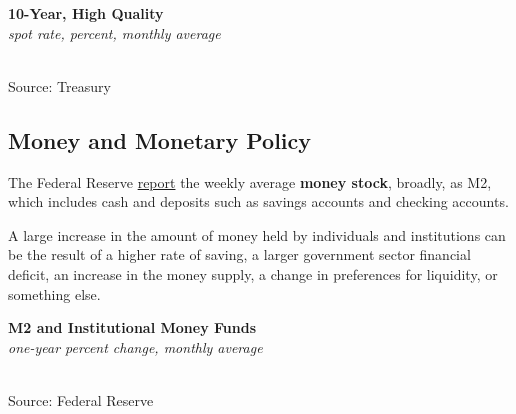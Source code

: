 \documentclass{report}
\makeatletter
\newcommand{\tbllink}[1]{\href{https://raw.githubusercontent.com/bdecon/US-chartbook/master/chartbook/data/#1}{\faTable}}
\newcommand*\short[1]{\expandafter\@gobbletwo\number\numexpr#1\relax}
\newcommand{\dateaxisticks}{
		date coordinates in=x, axis line style={draw=none},
		xmax={2021-06-15},
		max space between ticks=40,	    
		xtick={{1990-01-01}, {1992-01-01}, {1994-01-01}, 
			{1996-01-01}, {1998-01-01}, {2000-01-01}, 
			{2002-01-01}, {2004-01-01}, {2006-01-01},
			{2008-01-01}, {2010-01-01}, {2012-01-01}, {2014-01-01},
		    {2016-01-01}, {2018-01-01}, {2020-01-01}},
		minor xtick={{1989-01-01}, {1991-01-01}, {1993-01-01},
			{1995-01-01}, {1997-01-01}, {1999-01-01}, 
			{2001-01-01}, {2003-01-01}, {2005-01-01}, {2007-01-01},
		    {2009-01-01}, {2011-01-01}, {2013-01-01}, {2015-01-01},
		    {2017-01-01}, {2019-01-01}, {2021-01-01}},
		enlarge y limits={0.06}, enlarge x limits={0.01},
		}
\newcommand{\shdateaxisticks}{
		date coordinates in=x, axis line style={draw=none},
		xmax={2021-06-15},
		max space between ticks=40,	    
		xtick={{1990-01-01}, {1995-01-01}, {2000-01-01}, 
			{2005-01-01}, {2010-01-01}, {2015-01-01}, {2020-01-01}},
		minor xtick={},
		enlarge y limits={0.06}, enlarge x limits={0.01},
		}
\newcommand{\bbar}[2]{extra #1 ticks = {{#2}}, extra #1 tick labels = ,
		extra #1 tick style = {grid=major, grid style={thick, black!25}},}
\newcommand{\stdline}[4]{\addplot[very thick, no markers, color=#1] 
		table [x=#2, y=#3, col sep=comma] {#4};	}
\newcommand{\thickline}[4]{\addplot[ultra thick, no markers, color=#1] 
		table [x=#2, y=#3, col sep=comma] {#4};	}
\newcommand{\rbars}{
		\fill[color=black!10] (axis cs:{1990-07-01},\pgfkeysvalueof{/pgfplots/ymin}) rectangle 
			(axis cs:{1991-03-01}, \pgfkeysvalueof{/pgfplots/ymax});
		\fill[color=black!10] (axis cs:{2007-12-01},\pgfkeysvalueof{/pgfplots/ymin}) rectangle 
			(axis cs:{2009-07-01}, \pgfkeysvalueof{/pgfplots/ymax});
		\fill[color=black!10] (axis cs:{2001-03-01},\pgfkeysvalueof{/pgfplots/ymin}) rectangle 
			(axis cs:{2001-11-01}, \pgfkeysvalueof{/pgfplots/ymax});
		\fill[color=black!10] (axis cs:{2020-02-01},\pgfkeysvalueof{/pgfplots/ymin}) rectangle 
			(axis cs:{2021-06-15}, \pgfkeysvalueof{/pgfplots/ymax});}
\makeatother
\begin{document}
{{\begin{minipage}{0.27\textwidth}
\end{minipage}\hspace{8mm} \begin{minipage}{0.43\textwidth}
\normalsize \textbf{10-Year, High Quality}\\
\footnotesize{\textit{spot rate, percent, monthly average}}\\
\hspace*{-2mm} \\
\footnotesize{Source: Treasury} \hfill \tbllink{hqcb.csv}
\end{minipage}
\newpage
\begin{minipage}{0.76\textwidth}
\subsection*{\color{black!70} \seriffont Money and Monetary Policy}
\small The Federal Reserve \href{https://www.federalreserve.gov/releases/h6/current/default.htm}{report} the weekly average \textbf{money stock}, broadly, as M2, which includes cash and deposits such as savings accounts and checking accounts. 

A large increase in the amount of money held by individuals and institutions can be the result of a higher rate of saving, a larger government sector financial deficit, an increase in the money supply, a change in preferences for liquidity, or something else. 
\vspace{2mm}

\normalsize \textbf{M2 and Institutional Money Funds}\\
\footnotesize{\textit{one-year percent change, monthly average}}\\
\hspace*{-2mm} \\
\footnotesize{Source: Federal Reserve} \hfill \tbllink{M2imf.csv}
\end{minipage}
\newpage
\begin{minipage}{0.76\textwidth}

\end{minipage}}}
\end{document}
